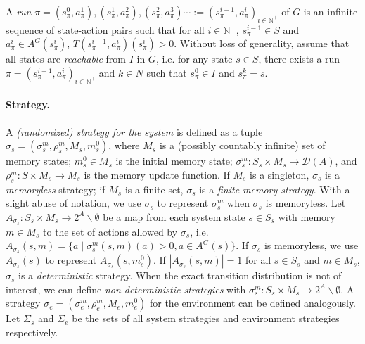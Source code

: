 \documentclass[runningheads,a4paper]{llncs}
\begin{document}
A \emph{run} $\pi =  (s_{\pi}^0, a_{\pi}^1), (s_{\pi}^1, a_{\pi}^2), (s_{\pi}^2, a_{\pi}^3) \cdots := (s_{\pi}^{i-1}, a_{\pi}^i)_{i \in \mathbb{N}^+}$ of $G$ is an infinite sequence of state-action pairs such that for all $i \in \mathbb{N}^+$, $s_{\pi}^{i-1} \in S$ and $a_{\pi}^i \in A^G(s_{\pi}^i)$,  $T(s_{\pi}^{i-1} , a_{\pi}^i)(s_{\pi}^i) > 0$. Without loss of generality, assume that all states are \emph{reachable} from $I$ in $G$, i.e. for any state $s \in S$, there exists a run $\pi =  (s_{\pi}^{i-1}, a_{\pi}^i)_{i \in \mathbb{N}^+}$ and $k \in N$ such that $s_{\pi}^0 \in I$ and $s_{\pi}^k = s$. 

\paragraph{Strategy.}
A \emph{(randomized) strategy for the system} is defined as a tuple $\sigma_s = (\sigma^m_s, \rho^m_s, M_s, m^0_s)$, where $M_s$ is a (possibly countably infinite) set of memory states; $m^0_s \in M_s$ is the initial memory state; $\sigma^m_s: S_s \times M_s \rightarrow \mathcal{D}(A)$, and $\rho^m_s: S \times M_s \rightarrow M_s$ is the memory update function. If $M_s$ is a singleton, $\sigma_s$ is a \emph{memoryless} strategy; if $M_s$ is a finite set, $\sigma_s$ is a \emph{finite-memory strategy}. With a slight abuse of notation, we use $\sigma_s$ to represent $\sigma^m_s$ when $\sigma_s$ is memoryless. 
Let $A_{\sigma_s}: S_s \times M_s \rightarrow 2^A \backslash \emptyset$ be a map from each system state $s \in S_s$ with memory $m \in M_s$ to the set of actions allowed by $\sigma_s$, i.e. $A_{\sigma_s}(s, m) = \{ a \mid \sigma^m_s(s,m)(a) > 0, a \in A^G(s) \}$. If $\sigma_s$ is memoryless, we use $A_{\sigma_s}(s)$ to represent $A_{\sigma_s}(s,m^0_s)$.
If $| A_{\sigma_s}(s,m) | = 1$ for all $s \in S_s$ and $m \in M_s$, $\sigma_s$ is a \emph{deterministic} strategy. When the exact transition distribution is not of interest, we can define \emph{non-deterministic strategies} with $\sigma^m_s: S_s \times M_s \rightarrow 2^{A} \backslash \emptyset$.
A strategy $\sigma_e = (\sigma^m_e, \rho^m_e, M_e, m^0_e)$ for the environment can be defined analogously. Let $\Sigma_s$ and $\Sigma_e$ be the sets of all system strategies and environment strategies respectively. 
\end{document}
